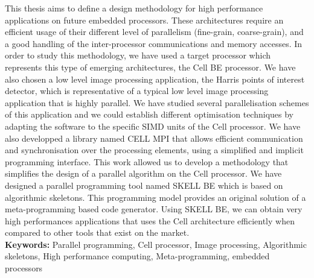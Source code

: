 This thesis aims to define a design methodology for high performance applications on future embedded processors. These architectures require an efficient usage of their different level of parallelism (fine-grain, coarse-grain), and a good handling of the inter-processor communications and memory accesses.
In order to study this methodology, we have used a target processor which represents this type of emerging architectures, the Cell BE processor. We have also chosen a low level image processing application, the Harris points of interest detector, which is representative of a typical low level image processing application that is highly parallel.
We have studied several parallelisation schemes of this application and we could establish different optimisation techniques by adapting the software to the specific SIMD units of the Cell  processor. We have also developped a library named CELL MPI that allows efficient communication and synchronisation over the processing elements, using a simplified and implicit programming interface. This work allowed us to develop a methodology that simplifies the design of a parallel algorithm on the Cell processor.
We have designed a parallel programming tool named SKELL BE which is based on algorithmic skeletons. This programming model provides an original solution of a meta-programming based code generator. Using SKELL BE, we can obtain very high performances applications that uses the Cell architecture efficiently when compared to other tools that exist on the market.\\
\textbf{Keywords: } Parallel programming, Cell processor, Image processing, Algorithmic skeletons, High performance computing, Meta-programming, embedded processors